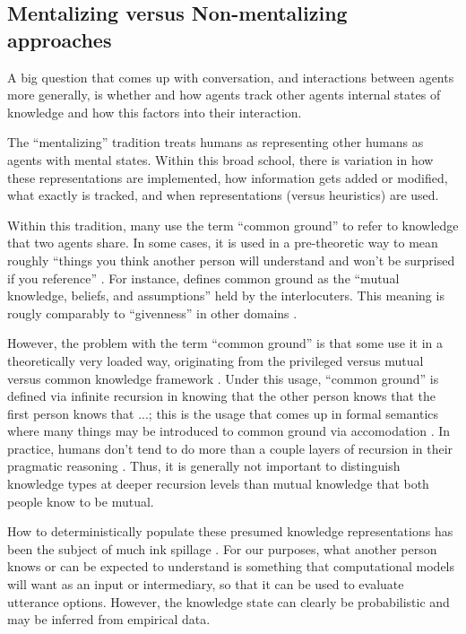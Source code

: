 \documentclass[]{article}
\begin{document}
\subsection{Mentalizing versus Non-mentalizing approaches}

A big question that comes up with conversation, and interactions between agents more generally, is whether and how agents track other agents internal states of knowledge and how this factors into their interaction.

The ``mentalizing'' tradition treats humans as representing other humans as agents with mental states. Within this broad school, there is variation in how these representations are implemented, how information gets added or modified, what exactly is tracked, and when representations (versus heuristics) are used. 

Within this tradition, many use the term ``common ground'' to refer to knowledge that two agents share. In some cases, it is used in a pre-theoretic way to mean roughly ``things you think another person will understand and won't be surprised if you reference'' \citep{leung2023, TODO}. For instance,  \citet{hanna2003} defines common ground as the ``mutual knowledge, beliefs, and assumptions'' held by the interlocuters. This meaning is rougly comparably to ``givenness'' in other domains \citep{fay2010}. 

 However, the problem with the term ``common ground'' is that some use it in a theoretically very loaded way, originating from the privileged versus mutual versus common knowledge framework \citep{TODO}. Under this usage, ``common ground'' is defined via infinite recursion in knowing that the other person knows that the first person knows that ...; this is the usage that comes up in formal semantics where many things may be introduced to common ground via accomodation \citep{horton1996, TODO}. In practice, humans don't tend to do more than a couple layers of recursion in their pragmatic reasoning \citep{frankeReasoningReferenceGames2016}. Thus, it is generally not important to distinguish knowledge types at deeper recursion levels than mutual knowledge that both people know to be mutual. 

How to deterministically populate these presumed knowledge representations has been the subject of much ink spillage \citep{horton1996,clark1996, TODO}. For our purposes, what another person knows or can be expected to understand is something that computational models will want as an input or intermediary, so that it can be used to evaluate utterance options. However, the knowledge state can clearly be probabilistic and may be inferred from empirical data. 
\end{document}
